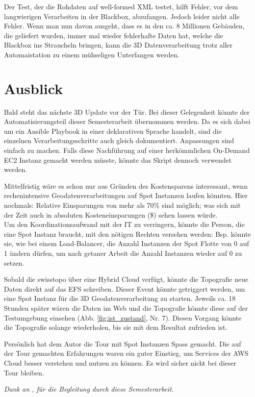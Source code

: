 Der Test, der die Rohdaten auf well-formed XML testet, hilft Fehler, vor dem langwierigen Verarbeiten in der Blackbox, abzufangen. Jedoch leider nicht alle Fehler. Wenn man nun davon ausgeht, dass es in den ca. 8 Millionen Gebäuden, die geliefert wurden, immer mal wieder fehlerhafte Daten hat, welche die Blackbox ins Straucheln bringen, kann die 3D Datenverarbeitung trotz aller Automaistation zu einem mühseligen Unterfangen werden.

\section{Ausblick}
Bald steht das nächste 3D Update vor der Tür. Bei dieser Gelegenheit könnte der Automatisierungsteil dieser Semesterarbeit übernommen werden. Da es sich dabei um ein Ansible Playbook in einer deklarativen Sprache handelt, sind die einzelnen Verarbeitungsschritte auch gleich dokumentiert. Anpassungen sind einfach zu machen. Falls diese Nachführung auf einer herkömmlichen On-Demand EC2 Instanz gemacht werden müsste, könnte das Skript dennoch verwendet werden.

Mittelfristig wäre es schon nur aus Gründen des Kostensparens interessant, wenn rechenintensive Geodatenverarbeitungen auf Spot Instanzen laufen könnten. Hier nochmals: Relative Einsparungen von mehr als 70\% sind möglich; was sich mit der Zeit auch in absoluten Kosteneinsparungen (\$) sehen lassen würde.\\ Um den Koordinationsaufwand mit der IT zu verringern, könnte die Person, die eine Spot Instanz braucht, mit den nötigen Rechten versehen werden: Bsp. könnte sie, wie bei einem Load-Balancer, die Anzahl Instanzen der Spot Flotte von 0 auf 1 ändern dürfen, um nach getaner Arbeit die Anzahl Instanzen wieder auf 0 zu setzen.

Sobald die swisstopo über eine Hybrid Cloud verfügt, könnte die Topografie neue Daten direkt auf das EFS schreiben. Dieser Event könnte getriggert werden, um eine Spot Instanz für die 3D Geodatenverarbeitung zu starten. Jeweils ca. 18 Stunden später wären die Daten im Web und die Topografie könnte diese auf der Testumgebung einsehen (Abb. \ref{fig:ist_zustand}, Nr. 7). Diesen Vorgang könnte die Topografie solange wiederholen, bis sie mit dem Resultat zufrieden ist.

Persönlich hat dem Autor die Tour mit Spot Instanzen Spass gemacht. Die auf der Tour gemachten Erfahrungen waren ein guter Einstieg, um Services der AWS Cloud besser verstehen und nutzen zu können. Es wird sicher nicht bei dieser Tour bleiben.

\vspace{4cm}
\textit{Dank an \prof, für die Begleitung durch diese Semesterarbeit.}

